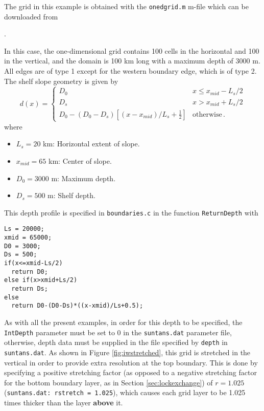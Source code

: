 The grid in this example is obtained with the 
\verb+onedgrid.m+ m-file which can be downloaded from 

\medskip
\noindent
\mfiledownload.

\medskip
\noindent
In this case, the one-dimensional grid contains 100 cells in the horizontal and 100 in the vertical, and
the domain is 100 km long with a maximum depth of 3000 m.  All edges are of type 1 except for the western
boundary edge, which is of type 2.
The shelf slope geometry is given by
\[
d(x) = \left\{\begin{array}{ll}
D_0 & x\le x_{mid}-L_s/2\\
D_s & x> x_{mid}+L_s/2\\
D_0 - \left(D_0-D_s\right)\left[(x-x_{mid})/L_s+\frac{1}{2}\right] & \mbox{otherwise}\,.
\end{array}\right.
\]
where
\begin{itemize}
\item[] $L_s=20$ km: Horizontal extent of slope.
\item[] $x_{mid}=65$ km: Center of slope.
\item[] $D_0=3000$ m: Maximum depth.
\item[] $D_s=500$ m: Shelf depth.
\end{itemize}
This depth profile is specified in \verb+boundaries.c+ in the function \verb+ReturnDepth+ with
\begin{verbatim}
Ls = 20000;
xmid = 65000;
D0 = 3000;
Ds = 500;
if(x<=xmid-Ls/2)
  return D0;
else if(x>xmid+Ls/2)
  return Ds;
else
  return D0-(D0-Ds)*((x-xmid)/Ls+0.5);
\end{verbatim}
As with all the present examples, in order for this depth to be specified, the \verb+IntDepth+ parameter must
be set to 0 in the \verb+suntans.dat+ parameter file, otherwise, depth data must be supplied in the
file specified by \verb+depth+ in \verb+suntans.dat+.  As shown in Figure \ref{fig:iwstretched},
this grid is stretched in the
vertical in order to provide extra resolution at the top boundary.  This is done by
specifying a positive stretching factor (as opposed to a negative stretching factor for the
bottom boundary layer, as in Section \ref{sec:lockexchange}) of $r=1.025$ (\verb+suntans.dat: rstretch = 1.025+),
which causes each grid layer to be 1.025 times thicker than the layer {\bf above} it.  

